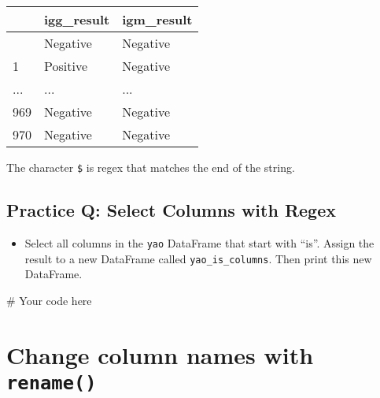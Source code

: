 \documentclass[
  letterpaper,
  DIV=11,
  numbers=noendperiod]{scrreprt}
\newenvironment{Shaded}{\begin{snugshade}}{\end{snugshade}}
\newcommand{\CommentTok}[1]{\textcolor[rgb]{0.37,0.37,0.37}{#1}}
\providecommand{\tightlist}{%
  \setlength{\itemsep}{0pt}\setlength{\parskip}{0pt}}\usepackage{longtable,booktabs,array}
\begin{document}
\begin{longtable}[]{@{}lll@{}}
\toprule\noalign{}
& igg\_result & igm\_result \\
\midrule\noalign{}
\endhead
\bottomrule\noalign{}
\endlastfoot
0 & Negative & Negative \\
1 & Positive & Negative \\
... & ... & ... \\
969 & Negative & Negative \\
970 & Negative & Negative \\
\end{longtable}

The character \texttt{\$} is regex that matches the end of the string.

\begin{tcolorbox}[enhanced jigsaw, colframe=quarto-callout-tip-color-frame, opacityback=0, titlerule=0mm, bottomrule=.15mm, breakable, leftrule=.75mm, colbacktitle=quarto-callout-tip-color!10!white, title=\textcolor{quarto-callout-tip-color}{\faLightbulb}\hspace{0.5em}{Practice}, rightrule=.15mm, coltitle=black, opacitybacktitle=0.6, colback=white, left=2mm, arc=.35mm, toptitle=1mm, bottomtitle=1mm, toprule=.15mm]

\subsection{Practice Q: Select Columns with
Regex}\label{practice-q-select-columns-with-regex}

\begin{itemize}
\tightlist
\item
  Select all columns in the \texttt{yao} DataFrame that start with
  ``is''. Assign the result to a new DataFrame called
  \texttt{yao\_is\_columns}. Then print this new DataFrame.
\end{itemize}

\begin{Shaded}
\begin{Highlighting}[]
\CommentTok{\# Your code here}
\end{Highlighting}
\end{Shaded}

\end{tcolorbox}

\section{\texorpdfstring{Change column names with
\texttt{rename()}}{Change column names with rename()}}\label{change-column-names-with-rename}
\end{document}
